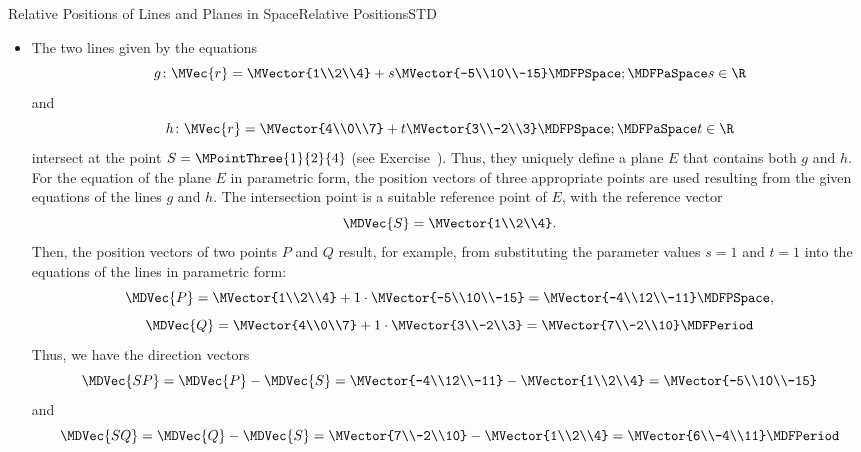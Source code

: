 \begin{MXContent}{Relative Positions of Lines and Planes in Space}{Relative Positions}{STD}
\begin{MExample}
\begin{itemize}
\item The two lines given by the equations 
\[
 g\colon\MVec{r}=\MVector{1\\2\\4}+s\MVector{-5\\10\\-15}\MDFPSpace;\MDFPaSpace s\in\R
\]
and
\[
 h\colon\MVec{r}=\MVector{4\\0\\7}+t\MVector{3\\-2\\3}\MDFPSpace;\MDFPaSpace t\in\R
\]
intersect at the point $S=\MPointThree{1}{2}{4}$ (see Exercise~). Thus, 
they uniquely define a plane $E$ that contains both $g$ and $h$. For the equation of the plane 
$E$ in parametric form, the position vectors of three appropriate points are used 
resulting from the given equations of the lines $g$ and $h$. The intersection point is a suitable reference point of $E$, with the reference vector
\[
 \MDVec{S}=\MVector{1\\2\\4}.
\]
Then, the position vectors of two points $P$ and $Q$ result, for example, from substituting 
the parameter values $s=1$ and $t=1$ into the equations of the lines in parametric form:
\[
 \MDVec{P}=\MVector{1\\2\\4}+1\cdot\MVector{-5\\10\\-15}=\MVector{-4\\12\\-11} \MDFPSpace,
\]
\[
 \MDVec{Q}=\MVector{4\\0\\7}+1\cdot\MVector{3\\-2\\3}=\MVector{7\\-2\\10} \MDFPeriod
\]
Thus, we have the direction vectors
\[
 \MDVec{S P}=\MDVec{P}-\MDVec{S}= \MVector{-4\\12\\-11}-\MVector{1\\2\\4}=\MVector{-5\\10\\-15}
\]
and
\[
 \MDVec{S Q}=\MDVec{Q}-\MDVec{S}= \MVector{7\\-2\\10}-\MVector{1\\2\\4}=\MVector{6\\-4\\11} \MDFPeriod
\]
\end{itemize}
\end{MExample}
\end{MXContent}
